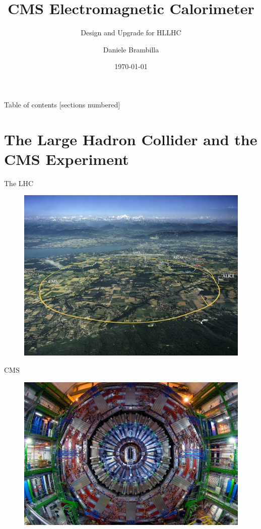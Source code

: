 \documentclass[10pt]{beamer}
\title{CMS Electromagnetic Calorimeter}
\subtitle{Design and Upgrade for HLLHC}
\date{\today}
\author{Daniele Brambilla}
\institute{University of Milano Bicocca}
\begin{document}
\maketitle

\begin{frame}{Table of contents}
  [sections numbered]
  \tableofcontents%
\end{frame}

\section[Introduction]{The Large Hadron Collider and the CMS Experiment}

\begin{frame}[fragile]{The LHC}
    \begin{figure}
        \centering
        \includegraphics[width=.85\textwidth]{./img/CERN_LHC.jpg}
    \end{figure}
\end{frame}

\begin{frame}[fragile]{CMS}
  \begin{figure}
        \centering
        \includegraphics[width=\textwidth]{./img/CMS_front.jpg}
    \end{figure}
\end{frame}
\end{document}
